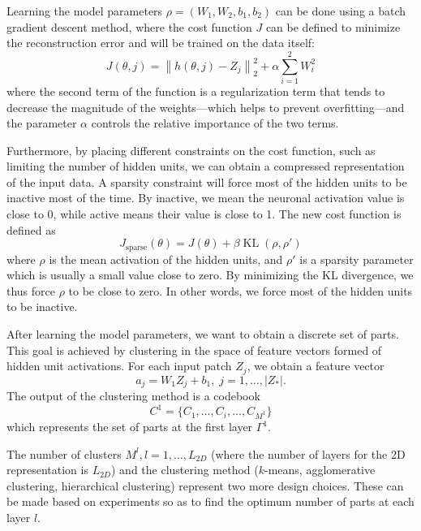\documentclass[runningheads]{llncs}
\newcommand{\KL}{\mathop{\textrm{KL}}}
\begin{document}
Learning the model parameters $\rho=(W_1,W_2,b_1,b_2)$ can be done using a batch gradient descent method, where the cost function $J$ can be defined to minimize the reconstruction error and will be trained on the data itself:
\begin{equation}
   J(\theta,j)=\left\|h(\theta,j)-Z_j\right\|_2^2 + \alpha\sum_{i=1}^{2} W_i^2
\end{equation}
where the second term of the function is a regularization term that tends to decrease the magnitude of the weights---which helps to prevent overfitting---and the parameter $\alpha$ controls the relative importance of the two terms.
 
Furthermore, by placing different constraints on the cost function, such as limiting the number of hidden units, we can obtain a compressed representation of the input data. A sparsity constraint will force most of the hidden units to be inactive most of the time. By inactive, we mean the neuronal activation value is close to 0, while active means their value is close to 1. The new cost function is defined as
\begin{equation}
J_{\textrm{sparse}}(\theta)=J(\theta)+\beta \KL(\rho,\rho')
\end{equation}
where $\rho$ is the mean activation of the hidden units, and $\rho'$ is a sparsity parameter which is usually a small value close to zero. By minimizing the KL divergence, we thus force $\rho$ to be close to zero. In other words, we force most of the hidden units to be inactive.

After learning the model parameters, we want to obtain a discrete set of parts. This goal is achieved by clustering in the space of feature vectors formed of hidden unit activations. For each input patch $Z_j$, we obtain a feature vector
\begin{equation}
a_j=W_1Z_j+b_1, \;j=1,\ldots,|Z_*|.
\end{equation}
The output of the clustering method is a codebook
\begin{equation}
C^1=\{C_1,\ldots,C_i,\ldots,C_{M^1}\}
\end{equation}
which represents the set of parts at the first layer $\Gamma^{1}$. 

The number of clusters $M^l, l=1,\ldots,L_{2D}$ (where the number of layers for the 2D representation is $L_{2D}$) and the clustering method ($k$-means, agglomerative clustering, hierarchical clustering) represent two more design choices. These can be made based on experiments so as to find the optimum number of parts at each layer $l$. 
\end{document}
